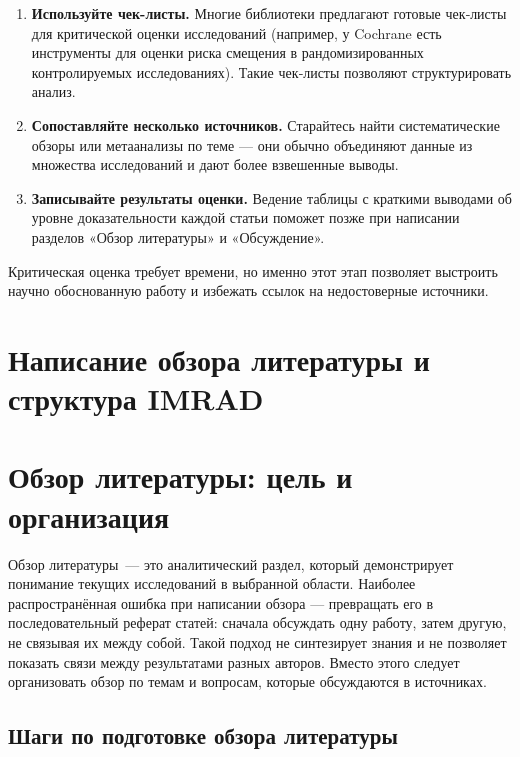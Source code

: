 \documentclass[
  russian,
  letterpaper,
]{book}
\providecommand{\tightlist}{%
  \setlength{\itemsep}{0pt}\setlength{\parskip}{0pt}}
\begin{document}
\begin{enumerate}
\def\labelenumi{\arabic{enumi}.}
\tightlist
\item
  \textbf{Используйте чек-листы.} Многие библиотеки предлагают готовые
  чек‑листы для критической оценки исследований (например, у Cochrane
  есть инструменты для оценки риска смещения в рандомизированных
  контролируемых исследованиях). Такие чек‑листы позволяют
  структурировать анализ.
\item
  \textbf{Сопоставляйте несколько источников.} Старайтесь найти
  систематические обзоры или метаанализы по теме --- они обычно
  объединяют данные из множества исследований и дают более взвешенные
  выводы.
\item
  \textbf{Записывайте результаты оценки.} Ведение таблицы с краткими
  выводами об уровне доказательности каждой статьи поможет позже при
  написании разделов «Обзор литературы» и «Обсуждение».
\end{enumerate}

Критическая оценка требует времени, но именно этот этап позволяет
выстроить научно обоснованную работу и избежать ссылок на недостоверные
источники.

\chapter{Написание обзора литературы и структура
IMRAD}\label{ux43dux430ux43fux438ux441ux430ux43dux438ux435-ux43eux431ux437ux43eux440ux430-ux43bux438ux442ux435ux440ux430ux442ux443ux440ux44b-ux438-ux441ux442ux440ux443ux43aux442ux443ux440ux430-imrad}

\chapter{Обзор литературы: цель и
организация}\label{sec-literature_review}

Обзор литературы~--- это аналитический раздел, который демонстрирует
понимание текущих исследований в выбранной области. Наиболее
распространённая ошибка при написании обзора --- превращать его в
последовательный реферат статей: сначала обсуждать одну работу, затем
другую, не связывая их между собой. Такой подход не синтезирует знания и
не позволяет показать связи между результатами разных авторов. Вместо
этого следует организовать обзор по темам и вопросам, которые
обсуждаются в источниках.

\section{Шаги по подготовке обзора
литературы}\label{ux448ux430ux433ux438-ux43fux43e-ux43fux43eux434ux433ux43eux442ux43eux432ux43aux435-ux43eux431ux437ux43eux440ux430-ux43bux438ux442ux435ux440ux430ux442ux443ux440ux44b}
\end{document}
